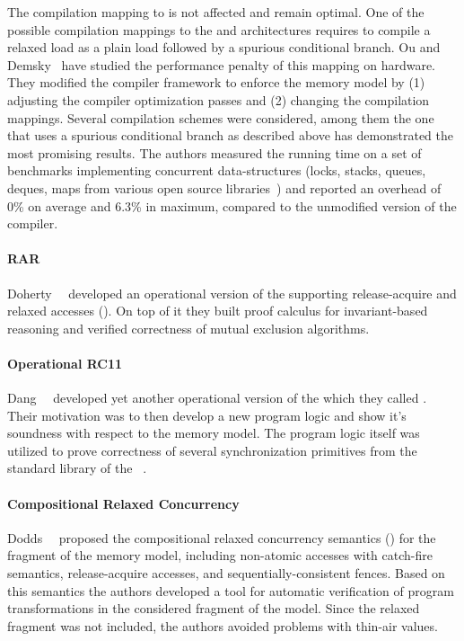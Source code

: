 The compilation mapping to \Intel is not affected and remain optimal.
One of the possible compilation mappings 
to the \ARM and \POWER architectures 
requires to compile a relaxed load as  
a plain load followed by a spurious conditional branch.
Ou and Demsky~\cite{Ou-Demsky:OOPSLA18} have studied 
the performance penalty of this mapping on  hardware.
They modified the \LLVM compiler framework 
to enforce the \RCMM memory model
by (1) adjusting the compiler optimization passes and 
(2) changing the compilation mappings.
Several compilation schemes were considered,
among them the one that uses a spurious conditional branch
as described above has demonstrated the most promising results.  
The authors measured the running time on a set of benchmarks 
implementing concurrent data-structures
(\eg locks, stacks, queues, deques, maps
from various open source libraries~\cite{CDSLib, FollyLib, JunctionLib})
and reported an overhead of 0\% on average and 6.3\% in maximum,
compared to the unmodified version of the compiler. 

\paragraph{RAR}

Doherty~\etal~\cite{Doherty-al:PPoPP19} developed an 
operational version of the \RCMM supporting 
release-acquire and relaxed accesses (\RAR). 
On top of it they built proof calculus for 
invariant-based reasoning and verified 
correctness of mutual exclusion algorithms. 

\paragraph{Operational RC11}

Dang~\etal~\cite{Dang-al:POPL19} developed yet another 
operational version of the \RCMM which they called \ORCMM. 
Their motivation was to then develop a 
new program logic and show it's soundness
with respect to the \ORCMM memory model. 
The program logic itself was utilized to 
prove correctness of several synchronization primitives 
from the standard library of the \Rust~\cite{RustBook:19}.

\paragraph{Compositional Relaxed Concurrency}

Dodds~\etal~\cite{Dodds-al:ESOP18} proposed the  
compositional relaxed concurrency semantics (\CRC) 
for the fragment of the \CMM memory model, 
including non-atomic accesses with catch-fire semantics, 
release-acquire accesses, and sequentially-consistent fences. 
Based on this semantics the authors developed 
a tool for automatic verification of program transformations
in the considered fragment of the \CMM model. 
Since the relaxed fragment was not included, 
the authors avoided problems with thin-air values. 

